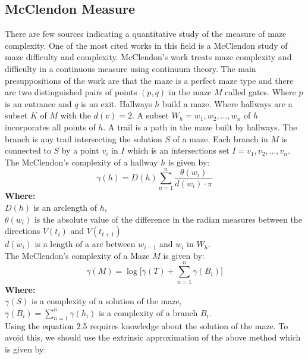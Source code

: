 \subsection{McClendon Measure}
There are few sources indicating a quantitative study of the measure of maze complexity. One of the most cited works in this field is a McClendon \textcolor{black}{\cite{McClendon}} study of maze difficulty and complexity. 
McClendon’s work treats maze complexity and difficulty in a continuous measure using continuum theory. The main presuppositions of the work are that the maze is a perfect maze type and there are two distinguished pairs of points $(p,q)$ in the maze $M$ called gates. Where $p$ is an entrance and $q$ is an exit.  Hallways  $h$ build a maze. 
Where hallways are a subset $K$ of $M$ with the \textcolor{black}{$d(v) = 2$}. A subset $W_h = {w_1,w_2,\ldots, w_n}$ of $h$ incorporates all points of $h$. 
A trail is a path in the maze built by hallways. The branch is any trail intersecting the solution $S$ of a maze. Each branch in $M$ is connected to $S$ by a point $v_i$ in $I$ which is an intersections set $I = {v_1,v_2,\dots, v_n}$. The McClendon’s complexity of a hallway $h$ is given by:\\
\begin{equation}
\gamma(h) = D(h)\sum_{n = 1}^{n} \frac{\theta(w_i)}{d(w_i)\cdot \pi}
\end{equation}
\textbf{Where:}\\
$D(h)$ is an arclength of $h$,\\ 
$\theta(w_i)$ is the absolute value of the difference in the radian measures between the directions $V(t_i)$ and $V(t_{t+1})$\\ 
$d(w_i)$ is a length of a arc between $w_{i-1}$ and $w_i$ in $W_h$.\\ 
\newline
The McClendon’s complexity of a Maze $M$ is given by:\\
\begin{equation}
\gamma(M)=\log\bigl[\gamma(T) + \sum_{n = 1}^{n} \gamma(B_i) \bigr]
\end{equation}
\textbf{Where:}\\
$\gamma(S)$ is a complexity of a solution of the maze,\\
$\gamma(B_i) = \sum_{n = 1}^{n} \gamma(h_i)$ is a complexity of a branch $B_i$.\\
\newline 
\textcolor{black}{Using the equation 2.5 } requires knowledge about the solution of the maze. To avoid this, we should use the extrinsic approximation of the above method which is given by:\\
